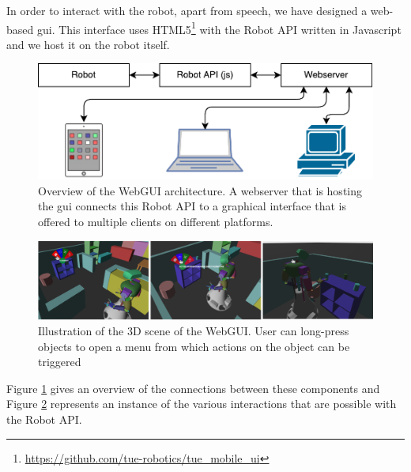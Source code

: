 \label{ssec:webgui}
In order to interact with the robot, apart from speech, we have designed a web-based \gls{gui}. This interface uses HTML5\footnote{\url{https://github.com/tue-robotics/tue_mobile_ui}} with the Robot API written in Javascript and we host it on the robot itself.
\begin{figure}[h]
    \centering
	\includegraphics[width=0.9\linewidth]{Figures/webgui_architecture}
	\caption{
		Overview of the WebGUI architecture.
		A webserver that is hosting the \protect\gls{gui} connects this Robot API to a graphical interface that is offered to multiple clients on different platforms.}
	\label{fig:webgui_architecture}
\end{figure}

\begin{figure}[H]
	\includegraphics[width=\linewidth]{Figures/gui_actions}
	\caption{
		Illustration of the 3D scene of the WebGUI.
		User can long-press objects to open a menu from which actions on the object can be triggered
		}
	\label{fig:gui_actions}

\end{figure}
Figure \ref{fig:webgui_architecture} gives an overview of the connections between these components and Figure \ref{fig:gui_actions} represents an instance of the various interactions that are possible with the Robot API.
